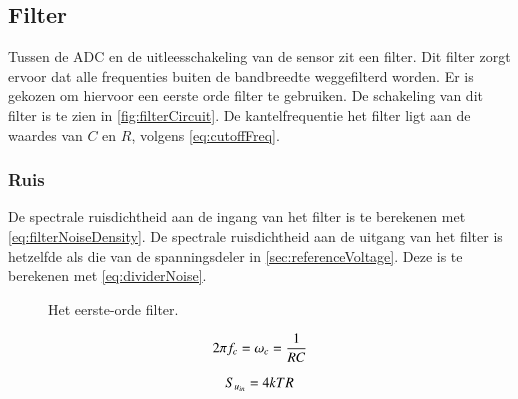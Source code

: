 \subsection{Filter}
Tussen de ADC en de uitleesschakeling van de sensor zit een filter. Dit filter zorgt ervoor dat alle frequenties buiten de bandbreedte weggefilterd worden. Er is gekozen om hiervoor een eerste orde filter te gebruiken.
De schakeling van dit filter is te zien in \autoref{fig:filterCircuit}. De kantelfrequentie het filter ligt aan de waardes van $C$ en $R$, volgens \autoref{eq:cutoffFreq}.

\subsubsection{Ruis}
De spectrale ruisdichtheid aan de ingang van het filter is te berekenen met \autoref{eq:filterNoiseDensity}.
De spectrale ruisdichtheid aan de uitgang van het filter is hetzelfde als die van de spanningsdeler in \autoref{sec:referenceVoltage}. Deze is te berekenen met \autoref{eq:dividerNoise}.

\begin{figure}[ht]
    \centering
    \def\svgwidth{0.3\textwidth}
    
    \caption{Het eerste-orde filter.}
    \label{fig:filterCircuit}
\end{figure}


\begin{equation} \label{eq:cutoffFreq}
    2\pi f_c = \omega_c = \frac{1}{RC}
    \tagaddtext{[\si{\radian\per\second}]}
\end{equation}


\begin{equation} \label{eq:filterNoiseDensity}
    S_{u_{in}} = 4kTR
    \tagaddtext{[\si{\volt\squared\per\hertz}]}
\end{equation}


